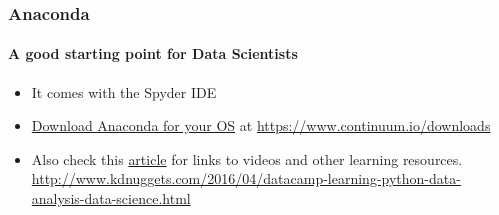 \documentclass{beamer}
\begin{document}
	\begin{frame}
	\frametitle{Anaconda}
	\framesubtitle{A good starting point for Data Scientists}
	\vspace{1em}
	\begin{itemize}
		\item It comes with the Spyder IDE
		\item \href{https://www.continuum.io/downloads}{Download Anaconda for your OS} at \url{https://www.continuum.io/downloads}
		\item Also check this \href{http://www.kdnuggets.com/2016/04/datacamp-learning-python-data-analysis-data-science.html}{article} for links to videos and other learning resources. \url{http://www.kdnuggets.com/2016/04/datacamp-learning-python-data-analysis-data-science.html}
	\end{itemize}
	\end{frame}
\end{document}

